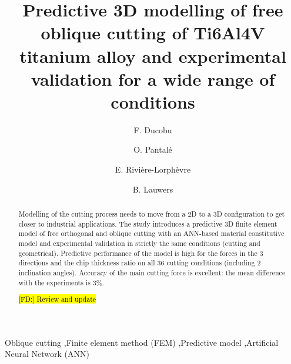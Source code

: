 \documentclass[final,5p,times,twocolumn]{elsarticle}
\DeclareRobustCommand{\FD}[1]{ {\begingroup\sethlcolor{VWgreen}\textcolor{black}{\hl{[FD:] #1}}\endgroup} }
\begin{document}
\begin{frontmatter}

\title{Predictive 3D modelling of free oblique cutting of Ti6Al4V titanium alloy and experimental validation for a wide range of conditions}

\author[1]{F. Ducobu}

\author[2]{O. Pantal\'{e}}
\author[1]{E. Rivi\`{e}re-Lorph\`{e}vre}
\author[3]{B. Lauwers}

\address[1]{Machine Design and Production Engineering Lab, Research Institute for Science and Material Engineering, UMONS, Belgium}
\address[2]{Laboratoire G\'{e}nie de Production, INP/ENIT, Universit\'{e} de Toulouse, Tarbes, France}
\address[3]{Department of Mechanical Engineering, KU Leuven \& Flanders Make@KU Leuven-MaPS, Belgium}

\begin{abstract}

Modelling of the cutting process needs to move from a 2D to a 3D configuration to get closer to industrial applications. The study introduces a predictive 3D finite element model of free orthogonal and oblique cutting with an ANN-based material constitutive model and experimental validation in strictly the same conditions (cutting and geometrical). Predictive performance of the model is high for the forces in the 3 directions and the chip thickness ratio on all 36 cutting conditions (including 2 inclination angles). Accuracy of the main cutting force is excellent: the mean difference with the experiments is 3\%.

\FD{Review and update}

\end{abstract}

\begin{keyword}

Oblique cutting \sep Finite element method (FEM) \sep Predictive model \sep Artificial Neural Network (ANN)

\end{keyword}

\end{frontmatter}

\linenumbers
\end{document}
